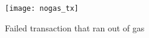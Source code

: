 \begin{figure}[H]
    \centering
    \texttt{[image: nogas\_tx]}
    \caption{Failed transaction that ran out of gas~\cite{preethi}}
    \label{fig:nogas_tx}
\end{figure}